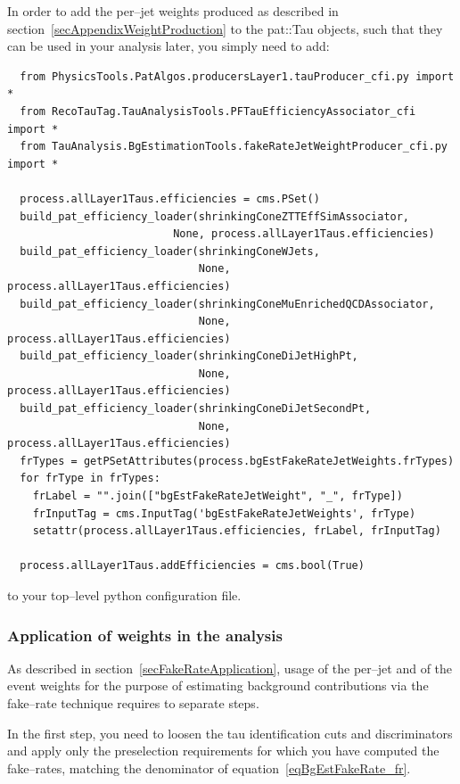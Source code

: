 In order to add the per--jet weights produced as described in section~\ref{secAppendixWeightProduction}
to the pat::Tau objects, such that they can be used in your analysis later,
you simply need to add:
\begin{small}
\begin{verbatim}
  from PhysicsTools.PatAlgos.producersLayer1.tauProducer_cfi.py import *
  from RecoTauTag.TauAnalysisTools.PFTauEfficiencyAssociator_cfi import *
  from TauAnalysis.BgEstimationTools.fakeRateJetWeightProducer_cfi.py import *

  process.allLayer1Taus.efficiencies = cms.PSet()
  build_pat_efficiency_loader(shrinkingConeZTTEffSimAssociator, 
	                      None, process.allLayer1Taus.efficiencies)
  build_pat_efficiency_loader(shrinkingConeWJets, 
                              None, process.allLayer1Taus.efficiencies)
  build_pat_efficiency_loader(shrinkingConeMuEnrichedQCDAssociator, 
                              None, process.allLayer1Taus.efficiencies)
  build_pat_efficiency_loader(shrinkingConeDiJetHighPt, 
                              None, process.allLayer1Taus.efficiencies)
  build_pat_efficiency_loader(shrinkingConeDiJetSecondPt, 
                              None, process.allLayer1Taus.efficiencies)
  frTypes = getPSetAttributes(process.bgEstFakeRateJetWeights.frTypes)	
  for frType in frTypes: 
    frLabel = "".join(["bgEstFakeRateJetWeight", "_", frType])
    frInputTag = cms.InputTag('bgEstFakeRateJetWeights', frType)
    setattr(process.allLayer1Taus.efficiencies, frLabel, frInputTag)

  process.allLayer1Taus.addEfficiencies = cms.bool(True)
\end{verbatim}
\end{small}
to your top--level python configuration file.

\subsubsection{Application of weights in the analysis}

As described in section~\ref{secFakeRateApplication}, 
usage of the per--jet and of the event weights for the purpose of estimating background contributions
via the fake--rate technique requires to separate steps.

In the first step, you need to loosen the tau identification cuts and discriminators and apply only
the preselection requirements for which you have computed the fake--rates,
matching the denominator of equation~\ref{eqBgEstFakeRate_fr}.

